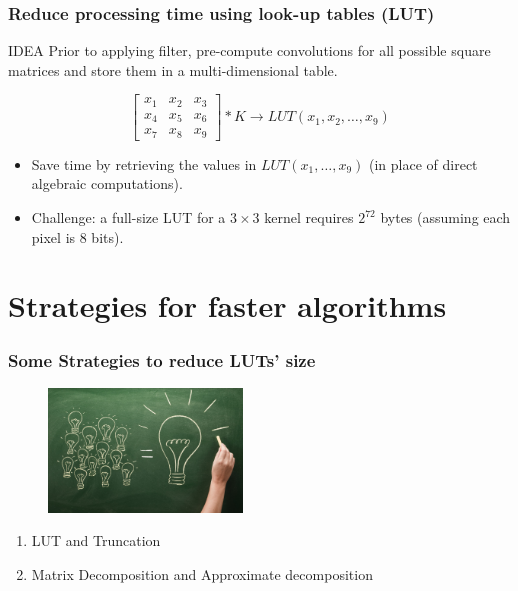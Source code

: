 \documentclass{beamer}
\begin{document}
\begin{frame}
\frametitle{Reduce processing time using look-up tables (LUT)}
\begin{beamerboxesrounded}[lower=eeks2,upper=eecks,
shadow=true]{IDEA}
Prior to applying filter,
pre-compute convolutions for all possible square matrices and 
store them in a multi-dimensional table.
\end{beamerboxesrounded}

$$
\begin{bmatrix}
x_1 & x_2 & x_3\\
x_4 & x_5 & x_6\\
x_7 & x_8 & x_9
\end{bmatrix}
*K \rightarrow LUT(x_1,x_2,\dots,x_9)
$$

\begin{itemize}
\item Save time by retrieving the values in $LUT(x_1,\dots,x_9)$ (in place of direct algebraic computations).
\item Challenge: a full-size LUT for a $3 \times 3$ kernel requires $2^{72}$ bytes (assuming each pixel is 8 bits).
\end{itemize}
\end{frame}

\section{Strategies for faster algorithms}

\begin{frame}
\frametitle{Some Strategies to reduce LUTs' size}
\begin{figure}[htb]
  \begin{center}
  \includegraphics[height=1.3in]{strategy.jpg}
  
  \end{center}
  \end{figure}
\begin{enumerate}
\item LUT and Truncation
\item Matrix Decomposition and Approximate decomposition
\end{enumerate}
\end{frame}
\end{document}
